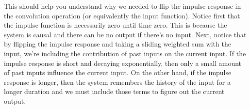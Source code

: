 This should help you understand why we needed to flip the impulse response in the convolution operation (or equivalently the input function).  Notice first that the impulse function is necessarily zero until time zero. This is because the system is causal and there can be no output if there's no input.  Next, notice that by flipping the impulse response and taking a sliding weighted sum with the input, we're including the contribution of past inputs on the current input.  If the impulse response is short and decaying exponentially, then only a small amount of past inputs influence the current input.  On the other hand, if the impulse response is longer, then the system remembers the history of the input for a longer duration and we must include those terms to figure out the current output.
